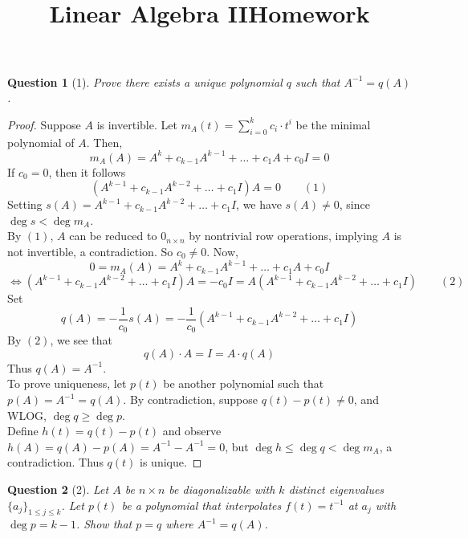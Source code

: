 \documentclass[11pt]{article}
\title{\vspace{-50pt}
\Huge \name
\\\vspace{20pt}
\huge Linear Algebra II\hfill Homework \hw}
\author{}
\date{}
\theoremstyle{quest}
\newtheorem*{question}{Question}
\begin{document}
\maketitle

\begin{question}[1]
Prove there exists a unique polynomial $q$ such that $A^{-1} = q(A)$.
\end{question}
\begin{proof}
Suppose $A$ is invertible. Let $m_A(t) = \sum_{i = 0}^k c_i \cdot t^i$ be the minimal polynomial of $A$. Then,
$$m_A(A) = A^k + c_{k-1} A^{k-1} + \ldots + c_1 A + c_0 I = 0$$
If $c_0 = 0$, then it follows
$$(A^{k-1} + c_{k-1}A^{k-2} + \ldots + c_1 I)A = 0\ \ \ \ \ \ \ \ \ (1)$$
Setting $s(A) = A^{k-1} + c_{k-1}A^{k-2} + \ldots + c_1 I$, we have $s(A) \ne 0$, since $\deg s < \deg m_A$. \\By $(1)$, $A$ can be reduced to $0_{n \times n}$ by nontrivial row operations, implying $A$ is not invertible, a contradiction. So $c_0 \ne 0$. Now,
$$0 = m_A(A) = A^k + c_{k-1} A^{k-1} + \ldots + c_1 A + c_0 I $$
$$\iff (A^{k-1} + c_{k-1}A^{k-2} + \ldots + c_1 I)A = -c_0 I = A(A^{k-1} + c_{k-1}A^{k-2} + \ldots + c_1 I)\ \ \ \ \ \ \ \ \ (2)$$
Set $$q(A) = -\frac{1}{c_0} s(A) = -\frac{1}{c_0} (A^{k-1} + c_{k-1}A^{k-2} + \ldots + c_1 I)$$
By $(2)$, we see that
$$q(A) \cdot A = I = A \cdot q(A)$$
Thus $q(A) = A^{-1}$.\\
To prove uniqueness, let $p(t)$ be another polynomial such that $p(A) = A^{-1} = q(A)$. By contradiction, suppose $q(t) - p(t) \ne 0$, and WLOG, $\deg q \ge \deg p$. \\Define $h(t) = q(t) - p(t)$ and observe $h(A) = q(A) - p(A) = A^{-1} - A^{-1} = 0$, but $\deg h \le \deg q < \deg m_A$, a contradiction. Thus $q(t)$ is unique.
\end{proof}
\begin{question}[2]
Let $A$ be $n \times n$ be diagonalizable with $k$ distinct eigenvalues $\{a_j\}_{1 \le j \le k}$. Let $p(t)$ be a polynomial that interpolates $f(t) = t^{-1}$ at $a_j$ with $\deg p = k-1$. Show that $p = q$ where $A^{-1} = q(A)$.
\end{question}
\end{document}
